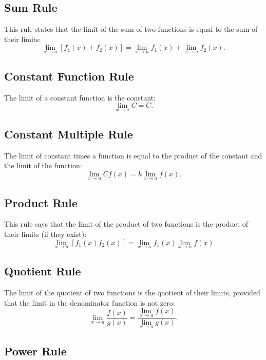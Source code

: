\documentclass[
]{book}
\begin{document}
\hypertarget{sum-rule-2}{%
\subsection{Sum Rule}\label{sum-rule-2}}

This rule states that the limit of the sum of two functions is equal to the sum of their limits:
\[
\lim_{x\to a}[f_1(x) + f_2(x) ] = \lim_{x\to a}f_1(x) + \lim_{x\to a}f_2(x).
\]

\hypertarget{constant-function-rule-2}{%
\subsection{Constant Function Rule}\label{constant-function-rule-2}}

The limit of a constant function is the constant: \[\lim_{x\to a} C = C.\]

\hypertarget{constant-multiple-rule-2}{%
\subsection{Constant Multiple Rule}\label{constant-multiple-rule-2}}

The limit of constant times a function is equal to the product of the constant and the limit of the function:
\[
\lim_{x\to a}Cf(x) = k\lim_{x\to a}f(x).
\]

\hypertarget{product-rule-2}{%
\subsection{Product Rule}\label{product-rule-2}}

This rule says that the limit of the product of two functions is the product of their limits (if they exist):
\[
\lim_{x\to a}[f_1(x)f_2(x)] = \lim_{x\to a}f_1(x)\lim_{x\to a}f(x)
\]

\hypertarget{quotient-rule-2}{%
\subsection{Quotient Rule}\label{quotient-rule-2}}

The limit of the quotient of two functions is the quotient of their limits, provided that the limit in the denominator function is not zero:
\[
\lim_{x\to a}\frac{f(x)}{g(x)} = \frac{\lim_{x\to a}f(x)}{\lim_{x\to a}g(x)}.
\]

\hypertarget{power-rule-2}{%
\subsection{Power Rule}\label{power-rule-2}}
\end{document}
